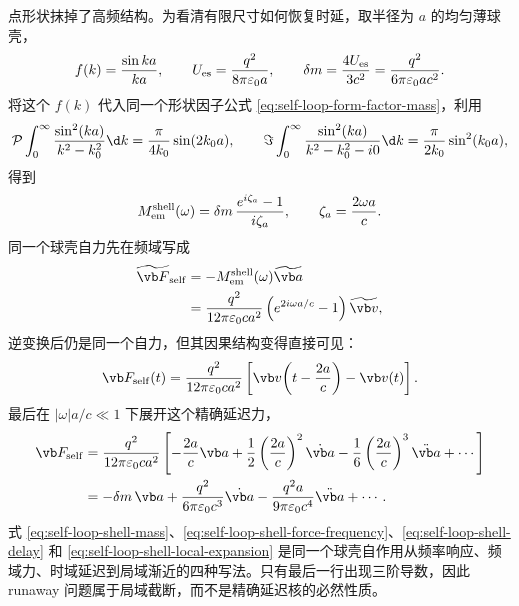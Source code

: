 点形状抹掉了高频结构。为看清有限尺寸如何恢复时延，取半径为 $a$ 的均匀薄球壳，
\begin{equation*}
 f(k)={\sin ka\over ka},
 \qquad
 U_{\mathrm{es}}={q^2\over8\pi\varepsilon_0a},
 \qquad
 \delta m={4U_{\mathrm{es}}\over3c^2}
 ={q^2\over6\pi\varepsilon_0ac^2}.
\end{equation*}
将这个 $f(k)$ 代入同一个形状因子公式 \eqref{eq:self-loop-form-factor-mass}，利用
\begin{equation*}
 \mathcal P\int_0^\infty{\sin^2(ka)\over k^2-k_0^2}\d k
 ={\pi\over4k_0}\sin(2k_0a),
 \qquad
 \Im\int_0^\infty{\sin^2(ka)\over k^2-k_0^2-i0}\d k
 ={\pi\over2k_0}\sin^2(k_0a),
\end{equation*}
得到
\begin{equation}
 M_{\mathrm{em}}^{\mathrm{shell}}(\omega)
 =\delta m\,{e^{i\zeta_a}-1\over i\zeta_a},
 \qquad
 \zeta_a={2\omega a\over c}.
 \label{eq:self-loop-shell-mass}
\end{equation}
同一个球壳自力先在频域写成
\begin{align}
 \widetilde{\vb F}_{\mathrm{self}}
 &=-M_{\mathrm{em}}^{\mathrm{shell}}(\omega)\widetilde{\vb a}
 \notag\\
 &={q^2\over12\pi\varepsilon_0ca^2}
 \left(e^{2i\omega a/c}-1\right)\widetilde{\vb v},
 \label{eq:self-loop-shell-force-frequency}
\end{align}
逆变换后仍是同一个自力，但其因果结构变得直接可见：
\begin{equation}
 \vb F_{\mathrm{self}}(t)
 ={q^2\over12\pi\varepsilon_0ca^2}
 \left[\vb v\!\left(t-{2a\over c}\right)-\vb v(t)\right].
 \label{eq:self-loop-shell-delay}
\end{equation}
最后在 $|\omega|a/c\ll1$ 下展开这个精确延迟力，
\begin{align}
 \vb F_{\mathrm{self}}
 &={q^2\over12\pi\varepsilon_0ca^2}
 \left[-{2a\over c}\vb a
 +{1\over2}\left({2a\over c}\right)^2\dot{\vb a}
 -{1\over6}\left({2a\over c}\right)^3\ddot{\vb a}+\cdots\right]
 \notag\\
 &=-\delta m\,\vb a
 +{q^2\over6\pi\varepsilon_0c^3}\dot{\vb a}
 -{q^2a\over9\pi\varepsilon_0c^4}\ddot{\vb a}+\cdots.
 \label{eq:self-loop-shell-local-expansion}
\end{align}
式 \eqref{eq:self-loop-shell-mass}、\eqref{eq:self-loop-shell-force-frequency}、\eqref{eq:self-loop-shell-delay} 和 \eqref{eq:self-loop-shell-local-expansion} 是同一个球壳自作用从频率响应、频域力、时域延迟到局域渐近的四种写法。只有最后一行出现三阶导数，因此 runaway 问题属于局域截断，而不是精确延迟核的必然性质。

